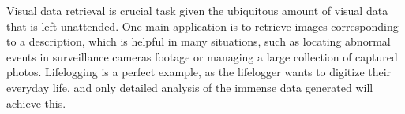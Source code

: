 \begin{EnAbstract}




\begin{spacing}{1.4} 
Visual data retrieval is crucial task given the ubiquitous amount of visual data that is left unattended. 
One main application is to retrieve images corresponding to a description, which is helpful in many situations, such as locating abnormal events in surveillance cameras footage or managing a large collection of captured photos. 
Lifelogging is a perfect example, as the lifelogger wants to digitize their everyday life, and only detailed analysis of the immense data generated will achieve this.


\end{spacing}
\end{EnAbstract}
